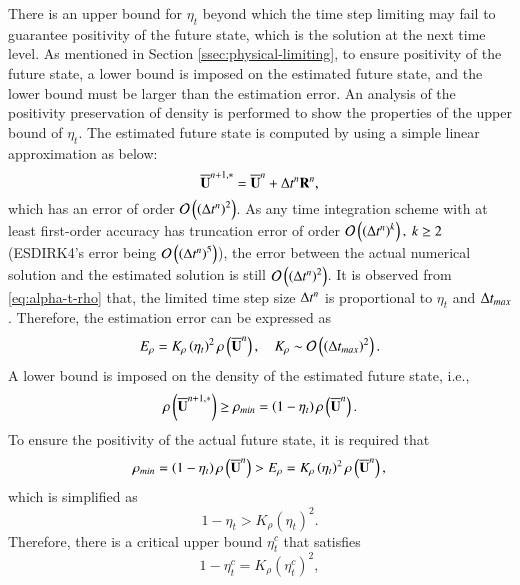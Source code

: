 There is an upper bound for $\eta_t$ beyond which the time step limiting may fail to guarantee positivity of the future state, which is the solution at the next time level. As mentioned in Section \ref{ssec:physical-limiting}, to ensure positivity of the future state, a lower bound is imposed on the estimated future state, and the lower bound must be larger than the estimation error. An analysis of the positivity preservation of density is performed to show the properties of the upper bound of $\eta_t$. The estimated future state is computed by using a simple linear approximation as below:
\begin{equation} 
    \overline{\mathbf{U}}^{n+1,*}=\overline{\mathbf{U}}^n + \mathrm\Delta t^n \mathbf{R}^n,
\end{equation}
which has an error of order $\mathcal{O}\left(\left(\mathrm\Delta t^n\right)^2\right)$.
As any time integration scheme with at least 
first-order accuracy has truncation error 
of order $\mathcal{O}\left(\left(\inc t^n\right)^k\right),\ k\geq2$
(ESDIRK4's error being $\mathcal{O}\left(\left(\mathrm\Delta t^n\right)^5\right)$),
the error between the actual numerical solution and the estimated
solution is still $\mathcal{O}\left(\left(\mathrm\Delta t^n\right)^2\right)$.
It is observed from \eqref{eq:alpha-t-rho} that, the limited time step size $\mathrm\Delta t^n$ is proportional to $\eta_t$ and $\mathrm\Delta t_{max}$. Therefore, the estimation error can be expressed as
\begin{equation}
    E_\rho= K_\rho \left(\eta_t\right)^2 \rho\left(\overline{\mathbf{U}}^n\right) , \quad K_\rho \sim \mathcal{O}\left(\left(\mathrm\Delta t_{max}\right)^2\right).
\end{equation}
A lower bound is imposed on the density of the estimated future state, i.e.,
\begin{equation}
    \rho\left(\overline{\mathbf{U}}^{n+1,*}\right) \geq \rho_{min}= \left(1-\eta_t\right) \rho\left(\overline{\mathbf{U}}^n\right).
\end{equation}
To ensure the positivity of the actual future state, it is required that
\begin{equation}
    \rho_{min}= \left(1-\eta_t\right) \rho\left(\overline{\mathbf{U}}^n\right) > E_\rho= K_\rho \left(\eta_t\right)^2 \rho\left(\overline{\mathbf{U}}^n\right),
\end{equation}
which is simplified as 
\begin{equation}
    1-\eta_t > K_\rho \left(\eta_t\right)^2.
\end{equation}
Therefore, there is a critical upper bound $\eta^c_t$ that satisfies 
\begin{equation}
    1-\eta^c_t = K_\rho \left(\eta^c_t\right)^2,
\end{equation}
